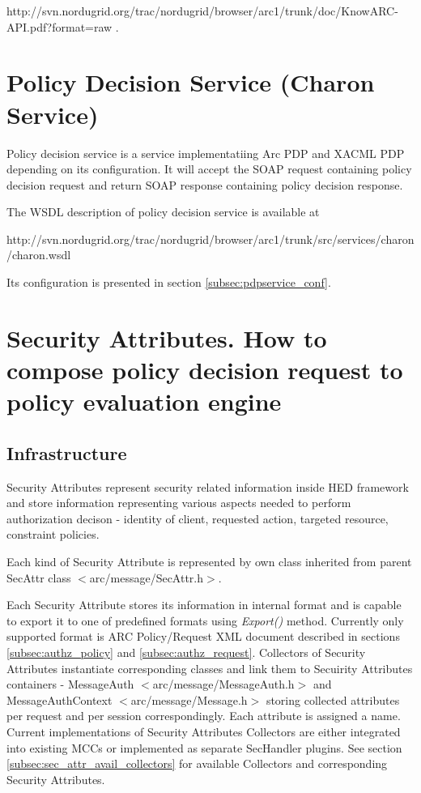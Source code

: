 \documentclass{article}                            %
\begin{document}
http://svn.nordugrid.org/trac/nordugrid/browser/arc1/trunk/doc/KnowARC-API.pdf?format=raw .



\section{Policy Decision Service (Charon Service)} %
\label{sec:policy_decision_service}
Policy decision service is a service implementatiing Arc PDP and XACML PDP depending on its configuration. It will accept the SOAP request containing policy decision request and return SOAP response containing policy decision response.

The WSDL description of policy decision service is available at

 http://svn.nordugrid.org/trac/nordugrid/browser/arc1/trunk/src/services/charon/charon.wsdl

Its configuration is presented in section \ref{subsec:pdpservice_conf}.



\section{Security Attributes. How to compose policy decision request to policy evaluation engine} %
\label{sec:sec_attributes}

\subsection{Infrastructure} %
\label{subsec:sec_attr_infrastructure}

Security Attributes represent security related information inside HED framework and store information representing various aspects needed to perform authorization decison - identity of client, requested action, targeted resource, constraint policies.

Each kind of Security Attribute is represented by own class inherited from parent SecAttr class $<$arc/message/SecAttr.h$>$.

Each Security Attribute stores its information in internal format and is capable to export it to one of predefined formats using \textit{Export()} method. Currently only supported format is ARC Policy/Request XML document described in sections \ref{subsec:authz_policy} and \ref{subsec:authz_request}.
Collectors of Security Attributes instantiate corresponding classes and link them to Secuirity Attributes containers - MessageAuth $<$arc/message/MessageAuth.h$>$ and MessageAuthContext $<$arc/message/Message.h$>$ storing collected attributes per request and per session correspondingly. Each attribute is assigned a name. Current implementations of Security Attributes Collectors are either integrated into existing MCCs or implemented as separate SecHandler plugins. See section \ref{subsec:sec_attr_avail_collectors} for available Collectors and corresponding Security Attributes.
\end{document}
